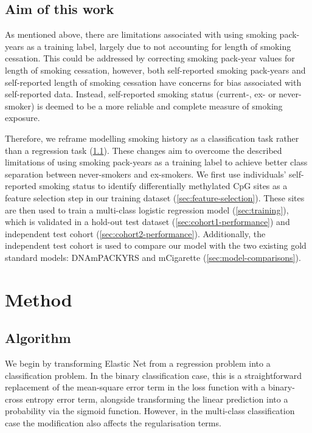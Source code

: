 \documentclass{article}
\begin{document}
\subsection{Aim of this work}

As mentioned above, there are limitations associated with using smoking pack-years as a training label, largely due to not accounting for length of smoking cessation. This could be addressed by correcting smoking pack-year values for length of smoking cessation, however, both self-reported smoking pack-years and self-reported length of smoking cessation have concerns for bias associated with self-reported data. Instead, self-reported smoking status (current-, ex- or never-smoker) is deemed to be a more reliable and complete measure of smoking exposure.

Therefore, we reframe modelling smoking history as a classification task rather than a regression task (\ref{sec:algorithm}). These changes aim to overcome the described limitations of using smoking pack-years as a training label to achieve better class separation between never-smokers and ex-smokers. We first use individuals' self-reported smoking status to identify differentially methylated CpG sites as a feature selection step in our training dataset (\ref{sec:feature-selection}). These sites are then used to train a multi-class logistic regression model (\ref{sec:training}), which is validated in a hold-out test dataset (\ref{sec:cohort1-performance}) and independent test cohort (\ref{sec:cohort2-performance}). Additionally, the independent test cohort is used to compare our model with the two existing gold standard models: DNAmPACKYRS and mCigarette (\ref{sec:model-comparisons}).

\section{Method}

\subsection{Algorithm} \label{sec:algorithm}
We begin by transforming Elastic Net from a regression problem into a classification problem. In the binary classification case, this is a straightforward replacement of the mean-square error term in the loss function with a binary-cross entropy error term, alongside transforming the linear prediction into a probability via the sigmoid function. However, in the multi-class classification case the modification also affects the regularisation terms.
\end{document}
